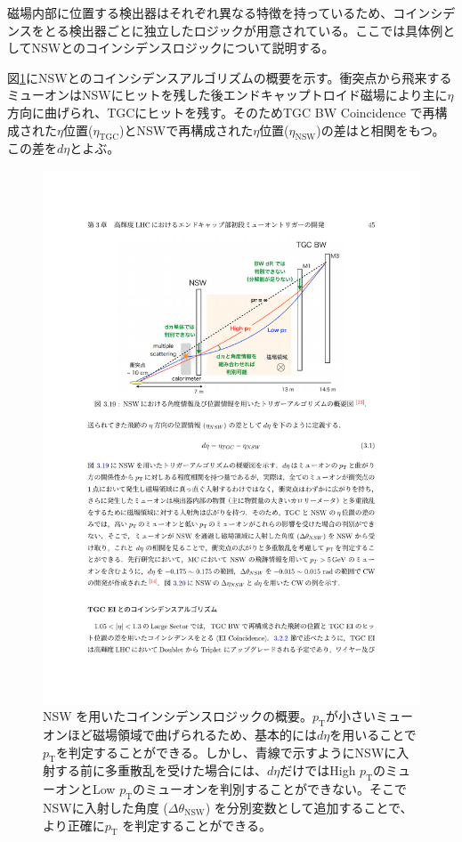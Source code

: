 磁場内部に位置する検出器はそれぞれ異なる特徴を持っているため、コインシデンスをとる検出器ごとに独立したロジックが用意されている。ここでは具体例としてNSWとのコインシデンスロジックについて説明する。

図\ref{Concept_NSW}にNSWとのコインシデンスアルゴリズムの概要を示す。衝突点から飛来するミューオンはNSWにヒットを残した後エンドキャップトロイド磁場により主に$\eta$方向に曲げられ、TGCにヒットを残す。そのためTGC BW Coincidence で再構成された$\eta$位置($\eta_{\mathrm{TGC}}$)とNSWで再構成された$\eta$位置($\eta_{\mathrm{NSW}}$)の差は\pt と相関をもつ。この差を$d\eta$とよぶ。

\begin{figure} 
\centering
\includegraphics[width=16cm]{fig/SL/Concept_NSW.pdf}
\caption[NSW を用いたコインシデンスロジックの概要]{NSW を用いたコインシデンスロジックの概要\cite{mt_akatsuka}。$p_\mathrm{T}$が小さいミューオンほど磁場領域で曲げられるため、基本的には$d\eta$を用いることで$p_\mathrm{T}$を判定することができる。しかし、青線で示すようにNSWに入射する前に多重散乱を受けた場合には、$d\eta$だけではHigh $p_\mathrm{T}$のミューオンとLow $p_\mathrm{T}$のミューオンを判別することができない。そこでNSWに入射した角度 ($\Delta\theta_{\mathrm{NSW}}$) を分別変数として追加することで、より正確に$p_\mathrm{T}$ を判定することができる。}
\label{Concept_NSW}
\end{figure}

